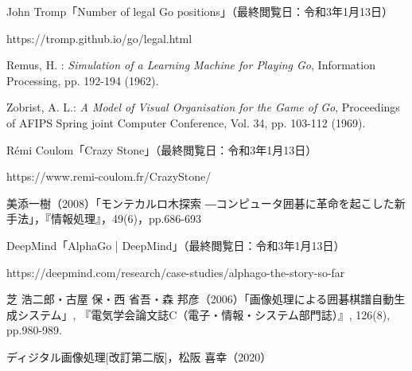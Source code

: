 \documentclass[openright]{nitocs}
\numberwithin{equation}{section}
\begin{document}
    \begin{thebibliography}{10} %


        John Tromp「Number of legal Go positions」（最終閲覧日：令和3年1月13日）

        https://tromp.github.io/go/legal.html

        Remus, H. : 
        {\it Simulation of a Learning Machine for Playing Go}, 
        Information Processing, 
        pp. 192-194 (1962). 

        Zobrist, A. L.: 
        {\it A Model of Visual Organisation for the Game of Go}, 
        Proceedings of AFIPS Spring joint Computer Conference, 
        Vol. 34, pp. 103-112 (1969). 

        Rémi Coulom「Crazy Stone」（最終閲覧日：令和3年1月13日）

        https://www.remi-coulom.fr/CrazyStone/

        美添一樹（2008）「モンテカルロ木探索 ―コンピュータ囲碁に革命を起こした新手法」，『情報処理』，49(6)，pp.686-693

        DeepMind「AlphaGo | DeepMind」（最終閲覧日：令和3年1月13日）
        
        https://deepmind.com/research/case-studies/alphago-the-story-so-far

        芝 浩二郎・古屋 保・西 省吾・森 邦彦（2006）「画像処理による囲碁棋譜自動生成システム」,  『電気学会論文誌C（電子・情報・システム部門誌）』, 126(8), pp.980-989.

        ディジタル画像処理[改訂第二版]，松阪 喜幸（2020）

    \end{thebibliography}
\end{document}
